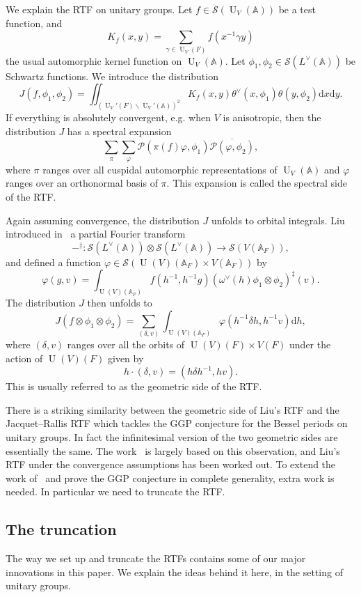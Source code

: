 \documentclass[letterpaper,11pt]{amsart}
\newcommand{\bA}{\mathbb{A}}
\newcommand{\cP}{\mathcal{P}}
\newcommand{\cS}{\mathcal{S}}
\newcommand{\rd}{\mathrm{d}}
\newcommand{\bs}{\backslash}
\newcommand{\<}{\negthickspace}
\DeclareMathOperator{\U}{U}
\theoremstyle{definition}
\theoremstyle{plain}
\theoremstyle{remark}
\numberwithin{equation}{section}
\begin{document}
We explain the RTF on unitary groups. Let $f \in \cS(\U_V(\bA))$ be a test function, and 
    \[
    K_f(x, y) = \sum_{\gamma \in \U_V(F)}
    f(x^{-1} \gamma y) 
    \]
the usual automorphic kernel function on $\U_V(\bA)$. Let $\phi_1, \phi_2 \in \cS(L^\vee(\bA))$ be Schwartz functions. We introduce the distribution
    \begin{equation}    \label{eq:J_intro}
    J(f, \phi_1, \phi_2) = \iint_{(\U_V'(F) \bs \U_V'(\bA))^2}
    K_f(x, y) \theta^\vee(x, \phi_1)
    \theta(y, \phi_2) \rd x \rd y.
    \end{equation}
If everything is absolutely convergent, e.g. when $V$ is anisotropic, then the distribution $J$ has a spectral expansion
    \[
    \sum_{\pi} \sum_{\varphi}
    \cP(\pi(f) \varphi, \phi_1) \overline{\cP(\varphi, \phi_2)},
    \]
where $\pi$ ranges over all cuspidal automorphic representations of $\U_V(\bA)$ and $\varphi$ ranges over an orthonormal basis of $\pi$. This expansion is called the spectral side of the RTF.

Again assuming convergence, the distribution $J$ unfolds to orbital integrals. Liu introduced in~\cite{Liu} a partial Fourier transform
    \[
    -^\ddag: \cS(L^\vee(\bA)) \otimes \cS(L^\vee(\bA)) \to \cS(V(\bA_F)),
    \]
and defined a function $\varphi \in \cS(\U(V)(\bA_F) \times V(\bA_F))$ by
    \[
    \varphi(g, v) = \int_{\U(V)(\bA_F)}  f(h^{-1}, h^{-1} g)
    (\omega^\vee(h) \phi_1 \otimes \phi_2)^\ddag(v).
    \]
The distribution $J$ then unfolds to 
    \[
    J(f \otimes \phi_1 \otimes \phi_2) = \sum_{(\delta, v) }
    \int_{\U(V)(\bA_F)} \varphi(h^{-1} \delta h, h^{-1} v) \rd h,
    \]
where $(\delta, v)$ ranges over all the orbits of $\U(V)(F) \times V(F)$ under the action of $\U(V)(F)$ given by
    \[
    h \cdot (\delta, v) = 
    (h \delta h^{-1}, h v).
    \]
This is usually referred to as the geometric side of the RTF.

There is a striking similarity between the geometric side of Liu's RTF and the Jacquet--Rallis RTF which tackles the GGP conjecture for the Bessel periods on unitary groups. In fact the infinitesimal version of the two geometric sides are essentially the same. The work~\cite{Xue1} is largely based on this observation, and Liu's RTF under the convergence assumptions has been worked out. To extend the work of~\cite{Xue1} and prove the GGP conjecture in complete generality, extra work is needed. In particular we need to truncate the RTF.


\subsection{The truncation}
The way we set up and truncate the RTFs contains some of our major innovations in this paper. We explain the ideas behind it here, in the setting of unitary groups.
\end{document}
